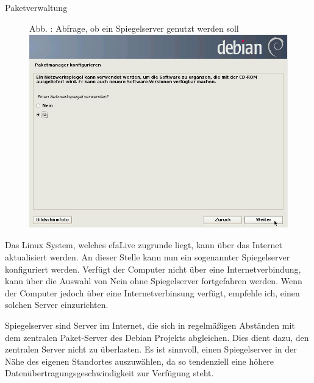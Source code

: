 \documentclass[a4paper,12pt,twoside]{article}
\newcounter{Abb}
\renewcommand\theAbb{\arabic{Abb}}
\begin{document}
\bigskip

Paketverwaltung


\bigskip



\begin{figure}
\centering
\begin{minipage}{11.269cm}
Abb. \stepcounter{Abb}{\theAbb}: Abfrage, ob ein Spiegelserver genutzt
werden soll
\includegraphics[width=11.269cm,height=8.403cm]{efaLivede-img/efaLivede-img13.png}\end{minipage}
\end{figure}
Das Linux System, welches efaLive zugrunde liegt, kann über das Internet
aktualisiert werden. An dieser Stelle kann nun ein sogenannter
Spiegelserver konfiguriert werden. Verfügt der Computer nicht über eine
Internetverbindung, kann über die Auswahl von
{\textquotedbl}Nein{\textquotedbl} ohne Spiegelserver fortgefahren
werden. Wenn der Computer jedoch über eine Internetverbinsung verfügt,
empfehle ich, einen solchen Server einzurichten.


\bigskip

Spiegelserver sind Server im Internet, die sich in regelmäßigen
Abständen mit dem zentralen Paket-Server des Debian Projekts
abgleichen. Dies dient dazu, den zentralen Server nicht zu überlasten.
Es ist sinnvoll, einen Spiegelserver in der Nähe des eigenen Standortes
auszuwählen, da so tendenziell eine höhere
Datenübertragungsgeschwindigkeit zur Verfügung steht.


\bigskip


\bigskip
\end{document}
